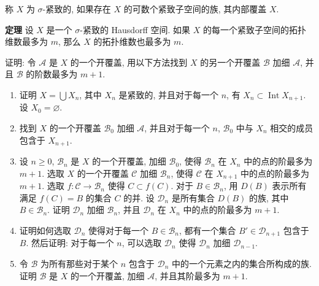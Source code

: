 \begin{exercise}
称 $X$ 为 $\sigma$-紧致的, 如果存在 $X$ 的可数个紧致子空间的族, 其内部覆盖 $X$.

\textbf{定理} 设 $X$ 是一个 $\sigma$-紧致的 Hausdorff 空间. 如果 $X$ 的每一个紧致子空间的拓扑维数最多为 $m$, 那么 $X$ 的拓扑维数也最多为 $m$.

证明: 令 $\mathcal{A}$ 是 $X$ 的一个开覆盖, 用以下方法找到 $X$ 的另一个开覆盖 $\mathcal{B}$ 加细 $\mathcal{A}$, 并且 $\mathcal{B}$ 的阶数最多为 $m+1$.
\begin{enumerate}
\item 证明 $X=\bigcup X_n$, 其中 $X_n$ 是紧致的, 并且对于每一个 $n$, 有 $X_n\subset\operatorname{Int}X_{n+1}$. 设 $X_0=\varnothing$.
\item 找到 $X$ 的一个开覆盖 $\mathcal{B}_0$ 加细 $\mathcal{A}$, 并且对于每一个 $n$, $\mathcal{B}_0$ 中与 $X_n$ 相交的成员包含于 $X_{n+1}$.
\item 设 $n\geqslant 0$, $\mathcal{B}_n$ 是 $X$ 的一个开覆盖, 加细 $\mathcal{B}_0$, 使得 $\mathcal{B}_n$ 在 $X_n$ 中的点的阶最多为 $m+1$. 选取 $X$ 的一个开覆盖 $\mathcal{C}$ 加细 $\mathcal{B}_n$, 使得 $\mathcal{C}$ 在 $X_{n+1}$ 中的点的阶最多为 $m+1$. 选取 $f\colon\mathcal{C}\to\mathcal{B}_n$ 使得 $C\subset f(C)$. 对于 $B\in\mathcal{B}_n$, 用 $D(B)$ 表示所有满足 $f(C)=B$ 的集合 $C$ 的并. 设 $\mathcal{D}_n$ 是所有集合 $D(B)$ 的族, 其中 $B\in\mathcal{B}_n$. 证明 $\mathcal{D}_n$ 加细 $\mathcal{B}_n$, 并且 $\mathcal{D}_n$ 在 $X_n$ 中的点的阶最多为 $m+1$.
\item 证明如何选取 $\mathcal{D}_n$ 使得对于每一个 $B\in\mathcal{B}_n$, 都有一个集合 $B'\in\mathcal{D}_{n+1}$ 包含于 $B$. 然后证明: 对于每一个 $n$, 可以选取 $\mathcal{D}_n$ 使得 $\mathcal{D}_n$ 加细 $\mathcal{D}_{n-1}$.
\item 令 $\mathcal{B}$ 为所有那些对于某个 $n$ 包含于 $\mathcal{D}_n$ 中的一个元素之内的集合所构成的族. 证明 $\mathcal{B}$ 是 $X$ 的一个开覆盖, 加细 $\mathcal{A}$, 并且其阶最多为 $m+1$.
\end{enumerate}
\end{exercise}
